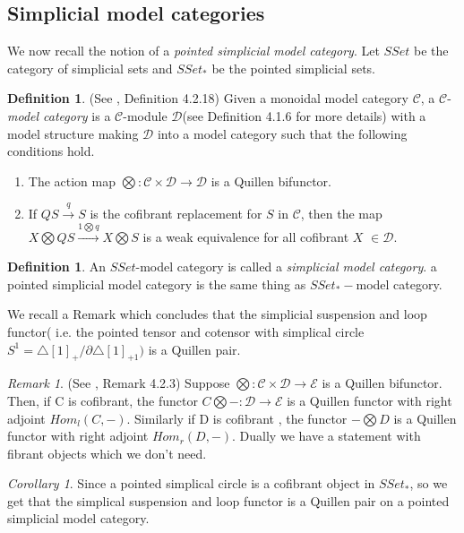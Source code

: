 \documentclass{article}
\newcommand{\cC}{\mathcal{C}}
\newcommand{\cD}{\mathcal{D}}
\theoremstyle{definition}
\newtheorem{definition}[theorem]{Definition}
\theoremstyle{remark}
\newtheorem{remark}[theorem]{Remark}
\newtheorem{corollary}[theorem]{Corollary}
\begin{document}
\subsection*{Simplicial model categories}

We now recall the notion of a \emph{pointed simplicial model category}. Let $SSet$ be the category of simplicial sets and $SSet_{*}$ be the pointed simplicial sets.
\begin{definition}
    (See \cite{MR1650134}, Definition 4.2.18) Given a monoidal model category $\cC$, a $\cC$-\textit{model category}  is a $\cC$-module $\cD$(see Definition 4.1.6 for more details) with a model structure making $\cD$ into a model category such that the following conditions hold.
    \begin{enumerate}
        \item The action map $\bigotimes:\cC \times \cD \rightarrow \cD$ is a Quillen bifunctor.
        \item If $QS \xrightarrow{q} S$ is the cofibrant replacement for $S$ in $\cC$, then the map $X \bigotimes QS  \xrightarrow{1\bigotimes q} X \bigotimes S$ is a weak equivalence for all cofibrant $X$ $\in \cD$.
    \end{enumerate}
\end{definition}
\begin{definition}\label{def:pointedsimpmodcat}
    An $SSet$-model category is called a \textit{simplicial model category}. a pointed simplicial model category is the same thing as $SSet_{*}-$model category.
\end{definition}
We recall a Remark which concludes that the simplicial suspension and loop functor( i.e. the pointed tensor and cotensor with simplical circle $S^{1}=\triangle[1]_{+}/ \partial \triangle[1]_{+1})$ is a Quillen pair.
\begin{remark}
    (See \cite{MR1650134}, Remark 4.2.3) Suppose $\bigotimes:\cC \times \cD \rightarrow \mathcal{E}$ is a Quillen bifunctor. Then, if C is cofibrant, the functor $C \bigotimes -: \cD \rightarrow \mathcal{E}$ is a Quillen functor with right adjoint $Hom_{l}(C,-)$. Similarly if D is cofibrant , the functor $- \bigotimes D$ is a Quillen functor with right adjoint $Hom_{r}(D,-)$. Dually we have a statement with fibrant objects which we don't need.
\end{remark}
\begin{corollary}
    
Since a pointed simplical circle is a cofibrant object in $SSet_{*}$, so we get that the simplical suspension and loop functor is a Quillen pair on a pointed simplicial model category.
\end{corollary}
\end{document}
